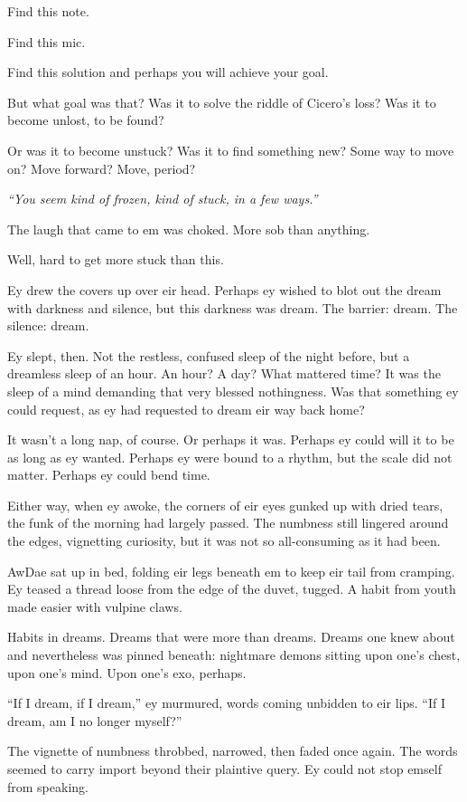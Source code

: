 Find this note.

Find this mic.

Find this solution and perhaps you will achieve your goal.

But what goal was that? Was it to solve the riddle of Cicero's loss? Was it to become unlost, to be found?

Or was it to become unstuck? Was it to find something new? Some way to move on? Move forward? Move, period?

\emph{``You seem kind of frozen, kind of stuck, in a few ways.''}

The laugh that came to em was choked. More sob than anything.

Well, hard to get more stuck than this.

Ey drew the covers up over eir head. Perhaps ey wished to blot out the dream with darkness and silence, but this darkness was dream. The barrier: dream. The silence: dream.

Ey slept, then. Not the restless, confused sleep of the night before, but a dreamless sleep of an hour. An hour? A day? What mattered time? It was the sleep of a mind demanding that very blessed nothingness. Was that something ey could request, as ey had requested to dream eir way back home?

It wasn't a long nap, of course. Or perhaps it was. Perhaps ey could will it to be as long as ey wanted. Perhaps ey were bound to a rhythm, but the scale did not matter. Perhaps ey could bend time.

Either way, when ey awoke, the corners of eir eyes gunked up with dried tears, the funk of the morning had largely passed. The numbness still lingered around the edges, vignetting curiosity, but it was not so all-consuming as it had been.

AwDae sat up in bed, folding eir legs beneath em to keep eir tail from cramping. Ey teased a thread loose from the edge of the duvet, tugged. A habit from youth made easier with vulpine claws.

Habits in dreams. Dreams that were more than dreams. Dreams one knew about and nevertheless was pinned beneath: nightmare demons sitting upon one's chest, upon one's mind. Upon one's exo, perhaps.

``If I dream, if I dream,'' ey murmured, words coming unbidden to eir lips. ``If I dream, am I no longer myself?''

The vignette of numbness throbbed, narrowed, then faded once again. The words seemed to carry import beyond their plaintive query. Ey could not stop emself from speaking.

